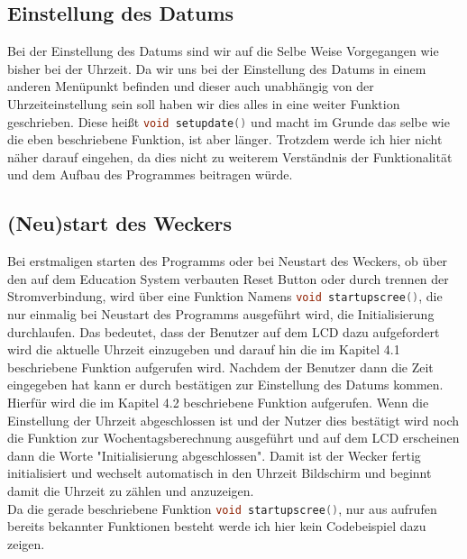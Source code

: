 \documentclass[openright,twoside,12pt,a4paper]{scrartcl}
\begin{document}
\begin{flushleft}
	 	\subsection{Einstellung des Datums}
	 	Bei der Einstellung des Datums sind wir auf die Selbe Weise Vorgegangen wie bisher bei der Uhrzeit. Da wir uns bei der Einstellung des Datums in einem anderen Menüpunkt befinden und dieser auch unabhängig von der Uhrzeiteinstellung sein soll haben wir dies alles in eine weiter Funktion geschrieben. Diese heißt \lstinline[language=c++,]|void setupdate()| und macht im Grunde das selbe wie die eben beschriebene Funktion, ist aber länger. Trotzdem werde ich hier nicht näher darauf eingehen, da dies nicht zu weiterem Verständnis der Funktionalität und dem Aufbau des Programmes beitragen würde.
	 	\subsection{(Neu)start des Weckers}
	 	Bei erstmaligen starten des Programms oder bei Neustart des Weckers, ob über den auf dem Education System verbauten Reset Button oder durch trennen der Stromverbindung, wird über eine Funktion Namens \lstinline[language=c++]|void startupscree()|, die nur einmalig bei Neustart des Programms ausgeführt wird, die Initialisierung durchlaufen. Das bedeutet, dass der Benutzer auf dem LCD dazu aufgefordert wird die aktuelle Uhrzeit einzugeben und darauf hin die im Kapitel 4.1 beschriebene Funktion aufgerufen wird. Nachdem der Benutzer dann die Zeit eingegeben hat kann er durch bestätigen zur Einstellung des Datums kommen. Hierfür wird die im Kapitel 4.2 beschriebene Funktion aufgerufen. Wenn die Einstellung der Uhrzeit abgeschlossen ist und der Nutzer dies bestätigt wird noch die Funktion zur Wochentagsberechnung ausgeführt und auf dem LCD erscheinen dann die Worte "Initialisierung abgeschlossen". Damit ist der Wecker fertig initialisiert und wechselt automatisch in den Uhrzeit Bildschirm und beginnt damit die Uhrzeit zu zählen und anzuzeigen. \\
	 	Da die gerade beschriebene Funktion \lstinline[language=c++]|void startupscree()|, nur aus aufrufen bereits bekannter Funktionen besteht werde ich hier kein Codebeispiel dazu zeigen. \\
	 	
	\end{flushleft}
\end{document}
